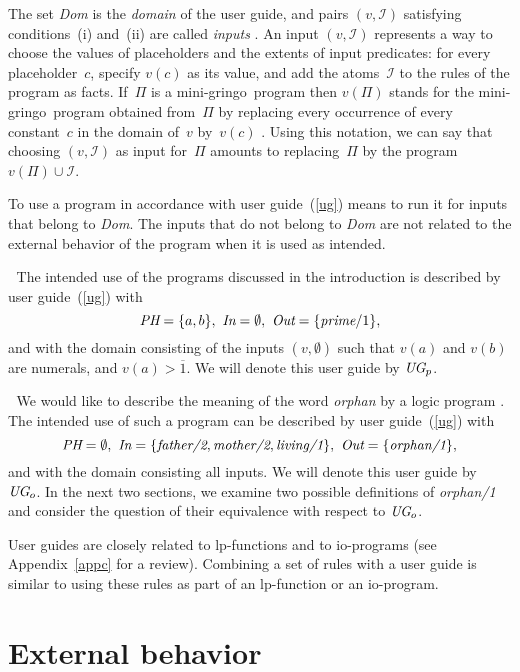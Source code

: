 \documentclass{article}
\def\gringo{{\sc gringo}}
\def\num{\overline}
\newcommand{\I}{\mathcal{I}}
\begin{document}
The set \emph{Dom} is the \emph{domain} of the user guide, and
pairs $(v,\I)$ satisfying conditions~(i) and~(ii) are called \emph{inputs}
\cite[Section~5.2]{fan20}.
An input $(v,\I)$ represents a way to choose the values of
placeholders and the extents of input predicates: for every
placeholder~$c$, specify $v(c)$ as its value, and add the atoms~$\I$
to the rules of the program as facts.  If~$\Pi$ is a mini-\gringo\ program
then $v(\Pi)$ stands for the mini-\gringo\ program obtained from~$\Pi$ by
replacing every occurrence of every constant~$c$ in the domain of~$v$
by~$v(c)$
\cite[Section~2.4]{fan22}.  Using this notation, we can say that
choosing $(v,\I)$ as input for~$\Pi$ amounts to
replacing~$\Pi$ by the program $v(\Pi)\cup\I$.

To use a program in accordance with user guide~(\ref{ug})
means to run it for inputs that belong to \emph{Dom}.  The
inputs that do not belong to \emph{Dom} are not related to the
external behavior of the program when it is used as intended.

\medskip{}$\;$ The intended use of the
programs discussed in the introduction is
described by user guide~(\ref{ug}) with
$$\emph{PH} = \{a,b\},\ \emph{In} = \emptyset,\
  \emph{Out} = \{\emph{prime}/1\},$$
and with the domain consisting of the inputs $(v,\emptyset)$ such that
$v(a)$ and $v(b)$ are numerals, and $v(a)>\num 1$.  We will denote this
user guide by $\emph{UG}_p$.

\medskip{}$\;$ We would like to describe the meaning
of the word \emph{orphan} by a logic program \cite[Section ??]{gel14}.
The intended use of such a
program can be described by user guide~(\ref{ug}) with
$$\emph{PH} = \emptyset,\
\emph{In} = \{\emph{father/2},\emph{mother/2}, \emph{living/1}\},\
\emph{Out} = \{\emph{orphan/1}\},$$
and with the domain consisting all inputs.    We will denote this
user guide by~$\emph{UG}_o$.  In the next two sections, we examine
two possible definitions of \hbox{\emph{orphan/1}}
and consider the question of their
equivalence with respect to $\emph{UG}_o$.
\medskip

User guides are closely related to
lp-functions \cite[Section~2]{gel02}
and to io-programs \cite[Section~5]{fan20} (see Appendix~\ref{appc} for
a review).
    Combining a set of rules with a user guide is similar to using these
    rules as part of
    an lp-function or an io-program.

\section{External behavior}
\end{document}
